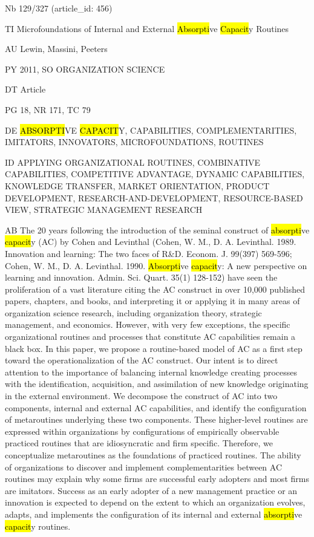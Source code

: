 \documentclass[a4paper]{article}
\begin{document}
\vspace*{-2cm}
Nb \tabto{0cm}129/327 (article\_id: 456)\par
TI \tabto{0cm}Microfoundations of Internal and External \hl{Absorpti}ve \hl{Capacit}y Routines\par
AU \tabto{0cm}Lewin, Massini, Peeters\par
PY \tabto{0cm}2011, SO ORGANIZATION SCIENCE\par
DT \tabto{0cm}Article\par
PG \tabto{0cm}18, NR 171, TC 79\par
DE \tabto{0cm}\hl{ABSORPTI}VE \hl{CAPACIT}Y, CAPABILITIES, COMPLEMENTARITIES, IMITATORS, INNOVATORS, MICROFOUNDATIONS, ROUTINES\par
ID \tabto{0cm}APPLYING ORGANIZATIONAL ROUTINES, COMBINATIVE CAPABILITIES, COMPETITIVE ADVANTAGE, DYNAMIC CAPABILITIES, KNOWLEDGE TRANSFER, MARKET ORIENTATION, PRODUCT DEVELOPMENT, RESEARCH-AND-DEVELOPMENT, RESOURCE-BASED VIEW, STRATEGIC MANAGEMENT RESEARCH\par
AB \tabto{0cm}The 20 years following the introduction of the seminal construct of \hl{absorpti}ve \hl{capacit}y (AC) by Cohen and Levinthal (Cohen, W. M., D. A. Levinthal. 1989. Innovation and learning: The two faces of R\&D. Econom. J. 99(397) 569-596; Cohen, W. M., D. A. Levinthal. 1990. \hl{Absorpti}ve \hl{capacit}y: A new perspective on learning and innovation. Admin. Sci. Quart. 35(1) 128-152) have seen the proliferation of a vast literature citing the AC construct in over 10,000 published papers, chapters, and books, and interpreting it or applying it in many areas of organization science research, including organization theory, strategic management, and economics. However, with very few exceptions, the specific organizational routines and processes that constitute AC capabilities remain a black box. In this paper, we propose a routine-based model of AC as a first step toward the operationalization of the AC construct. Our intent is to direct attention to the importance of balancing internal knowledge creating processes with the identification, acquisition, and assimilation of new knowledge originating in the external environment. We decompose the construct of AC into two components, internal and external AC capabilities, and identify the configuration of metaroutines underlying these two components. These higher-level routines are expressed within organizations by configurations of empirically observable practiced routines that are idiosyncratic and firm specific. Therefore, we conceptualize metaroutines as the foundations of practiced routines. The ability of organizations to discover and implement complementarities between AC routines may explain why some firms are successful early adopters and most firms are imitators. Success as an early adopter of a new management practice or an innovation is expected to depend on the extent to which an organization evolves, adapts, and implements the configuration of its internal and external \hl{absorpti}ve \hl{capacit}y routines.\par
\clearpage
\end{document}

